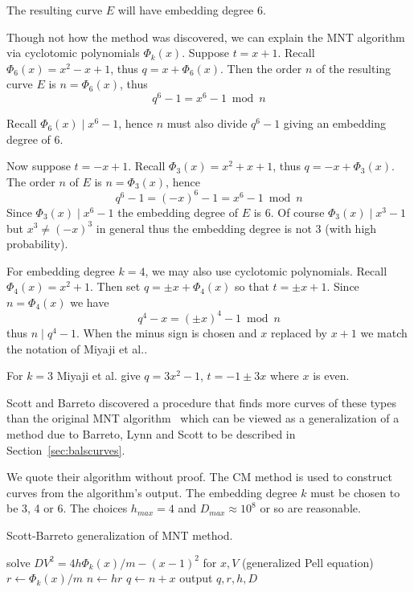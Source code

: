 The resulting curve $E$ will have embedding degree 6.

Though not how the method was discovered,
we can explain the MNT algorithm via cyclotomic polynomials $\Phi_k(x)$.
Suppose $t = x + 1$.
Recall $\Phi_6(x) = x^2 - x + 1$, thus
$q = x + \Phi_6(x)$.
Then the order $n$ of the resulting
curve $E$ is $n = \Phi_6(x)$, thus
\[ q^6 - 1 = x^6 - 1 \bmod n \]

Recall $\Phi_6(x) \mid x^6 - 1$, hence $n$ must also divide $q^6 - 1$
giving an embedding degree of 6.

Now suppose $t = -x + 1$.
Recall $\Phi_3(x) = x^2 + x + 1$, thus
$q = -x + \Phi_3(x)$.
The order $n$ of $E$ is $n = \Phi_3(x)$, hence
\[ q^6 - 1 = (-x)^6 - 1 = x^6 - 1 \bmod n \]
Since $\Phi_3(x) \mid x^6 - 1$ the embedding degree of $E$ is 6.
Of course $\Phi_3(x) \mid x^3 - 1$ but $x^3 \ne (-x)^3$ in general
thus the embedding degree is not 3 (with high probability).

For embedding degree $k=4$, we may also use cyclotomic polynomials.
Recall $\Phi_4(x) = x^2 + 1$. Then set $q = \pm x + \Phi_4(x)$
so that $t = \pm x + 1$. Since $n = \Phi_4(x)$ we have
\[ q^4 - x = (\pm x)^4 - 1 \bmod n \]
thus $n \mid q^4 - 1$.
When the minus sign is chosen and $x$ replaced by $x+1$ 
we match the notation of Miyaji et al.\cite{mnt}.

For $k=3$ Miyaji et al. give $q = 3 x^2 - 1$, $t = -1 \pm 3x$ where $x$ is
even.

Scott and Barreto discovered a procedure that finds more curves of these
types than the original MNT algorithm~\cite{moremnt}
which can be viewed as a generalization of a method due to
Barreto, Lynn and Scott to be described in Section~\ref{sec:balscurves}.

We quote their algorithm without proof.
The CM method is used to construct curves from the algorithm's output.
The embedding degree $k$ must be chosen to be 3, 4 or 6.
The choices $h_{max} = 4$ and $D_{max} \approx 10^8$ or so are reasonable.

\begin{algorithm}
\caption {Scott-Barreto generalization of MNT method.}
\begin{algorithmic}[1]
	    \STATE solve $DV^2 = 4 h \Phi_k(x) / m - (x-1)^2$ for $x, V$ (generalized Pell equation)
	    \STATE $r\gets \Phi_k(x) /m$
	    \STATE $n\gets hr$
	    \STATE $q\gets n + x$
		\STATE output $q, r, h, D$
	    \ENDIF
	\ENDFOR
    \ENDFOR
\ENDFOR
\end{algorithmic}
\end{algorithm}

